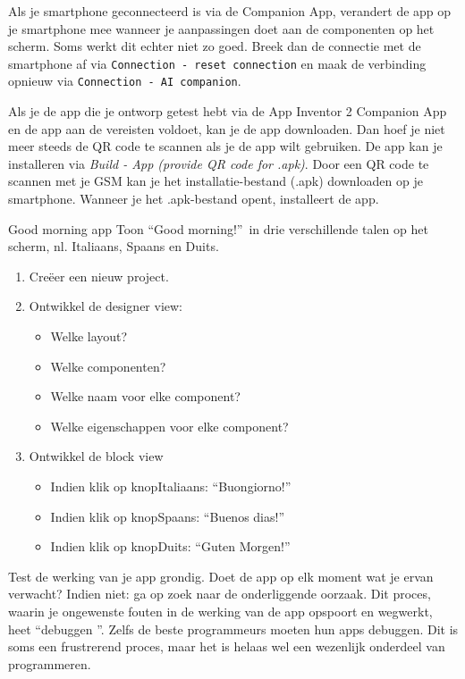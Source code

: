 Als je smartphone geconnecteerd is via de Companion App, verandert de app op je smartphone mee wanneer je aanpassingen doet aan de componenten op het scherm. Soms werkt dit echter niet zo goed. Breek dan de connectie met de smartphone af via \texttt{Connection - reset connection} en maak de verbinding opnieuw via \texttt{Connection - AI companion}.

Als je de app die je ontworp getest hebt via de App Inventor 2 Companion App en de app aan de vereisten voldoet, kan je de app downloaden. Dan hoef je niet meer steeds de QR code te scannen als je de app wilt gebruiken. De app kan je installeren via \emph{Build - App (provide QR code for .apk)}. Door een QR code te scannen met je GSM kan je het installatie-bestand (.apk) downloaden op je smartphone. Wanneer je het .apk-bestand opent, installeert de app.

\begin{opdracht}{Good morning app}
	Toon \textquotedblleft Good morning!\textquotedblright \ in drie verschillende talen op het scherm, nl. Italiaans, Spaans en Duits.
	
	\begin{minipage}{.5\linewidth}
	\end{minipage}
	\begin{minipage}{.5\linewidth}
		\begin{enumerate}
			\item Cre\"eer een nieuw project.
			\item Ontwikkel de designer view:
			\begin{itemize}
				\item Welke layout?
				\item Welke componenten?
				\item Welke naam voor elke component?
				\item Welke eigenschappen voor elke component?
			\end{itemize}
			\item Ontwikkel de block view
			\begin{itemize}
				\item Indien klik op knopItaliaans: \textquotedblleft Buongiorno!\textquotedblright
				\item Indien klik op knopSpaans: \textquotedblleft Buenos dias!\textquotedblright
				\item Indien klik op knopDuits: \textquotedblleft Guten Morgen!\textquotedblright
			\end{itemize}
		\end{enumerate}
	\end{minipage}

Test de werking van je app grondig. Doet de app op elk moment wat je ervan verwacht? Indien niet: ga op zoek naar de onderliggende oorzaak. Dit proces, waarin je ongewenste fouten in de werking van de app opspoort en wegwerkt, heet \textquotedblleft debuggen \textquotedblright. Zelfs de beste programmeurs moeten hun apps debuggen. Dit is soms een frustrerend proces, maar het is helaas wel een wezenlijk onderdeel van programmeren.

\end{opdracht}

